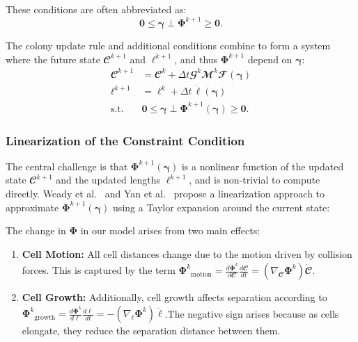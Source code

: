 \documentclass[conference]{IEEEtran}
\begin{document}
These conditions are often abbreviated as:
\begin{equation}
    \mathbf{0} \leq \boldsymbol{\gamma} \perp \mathbf{\Phi}^{k+1} \geq \mathbf{0}.
\end{equation}


The colony update rule and additional conditions combine to form a system where the future state $\mathbfcal{C}^{k+1}$ and $\boldsymbol{\ell}^{k+1}$, and thus $\mathbf{\Phi}^{k+1}$ depend on $\boldsymbol{\gamma}$:
\begin{equation} \label{eq:colony_update_with_constraints}
    \begin{split}
        \mathbfcal{C}^{k+1} & = \mathbfcal{C}^k + \Delta t \mathbfcal{G}^k \mathbfcal{M}^k \mathbfcal{F}(\boldsymbol{\gamma})  \\
        \boldsymbol{\ell}^{k+1} & = \boldsymbol{\ell}^k + \Delta t \, \dot{\boldsymbol{\ell}}(\boldsymbol{\gamma}) \\
        \text{s.t.} \quad & \mathbf{0} \leq \boldsymbol{\gamma} \perp \mathbf{\Phi}^{k+1}(\boldsymbol{\gamma}) \geq \mathbf{0}.
    \end{split}
\end{equation}

\subsubsection{Linearization of the Constraint Condition}

The central challenge is that $\mathbf{\Phi}^{k+1}(\boldsymbol{\gamma})$ is a nonlinear function of the updated state $\mathbfcal{C}^{k+1}$ and the updated lengths $\boldsymbol{\ell}^{k+1}$, and is non-trivial to compute directly. Weady et al.~\cite{Weady2024SM} and Yan et al.~\cite{Yan_2020} propose a linearization approach to approximate $\mathbf{\Phi}^{k+1}(\boldsymbol{\gamma})$ using a Taylor expansion around the current state:

\noindent The change in $\mathbf{\Phi}$ in our model arises from two main effects:

\begin{enumerate}
    \item \textbf{Cell Motion:} All cell distances change due to the motion driven by collision forces. This is captured by the term $\dot{\mathbf{\Phi}^k}_{\text{motion}} = \frac{d \mathbf{\Phi}^k}{d \mathbfcal{C}} \frac{d \mathbfcal{C}}{dt} = (\nabla_{\mathbfcal{C}} \mathbf{\Phi}^k) \dot{\mathbfcal{C}}$.
    \item \textbf{Cell Growth:} Additionally, cell growth affects separation according to $\dot{\mathbf{\Phi}^k}_{\text{growth}} = \frac{d \mathbf{\Phi}^k}{d \boldsymbol{\ell}} \frac{d \boldsymbol{\ell}}{dt} =-(\nabla_{\boldsymbol{\ell}} \mathbf{\Phi}^k) \dot{\boldsymbol{\ell}}$.\newline The negative sign arises because as cells elongate, they reduce the separation distance between them.
\end{enumerate}
\end{document}
